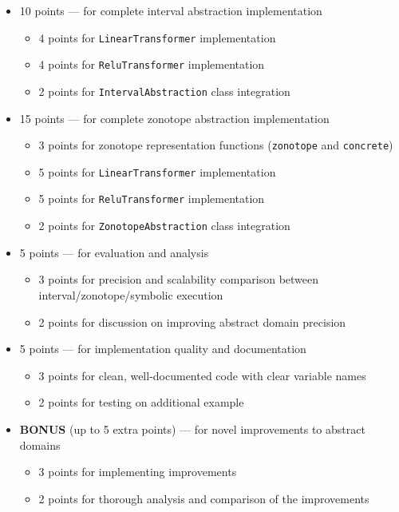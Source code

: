 \begin{itemize}
\item 10 points — for complete interval abstraction implementation
    \begin{itemize}
    \item 4 points for \texttt{LinearTransformer} implementation
    \item 4 points for \texttt{ReluTransformer} implementation
    \item 2 points for \texttt{IntervalAbstraction} class integration
    \end{itemize}
\item 15 points — for complete zonotope abstraction implementation
    \begin{itemize}
    \item 3 points for zonotope representation functions (\texttt{zonotope} and \texttt{concrete})
    \item 5 points for \texttt{LinearTransformer} implementation
    \item 5 points for \texttt{ReluTransformer} implementation
    \item 2 points for \texttt{ZonotopeAbstraction} class integration
    \end{itemize}
\item 5 points — for evaluation and analysis
    \begin{itemize}
    \item 3 points for precision and scalability comparison between interval/zonotope/symbolic execution
    \item 2 points for discussion on improving abstract domain precision
    \end{itemize}
\item 5 points — for implementation quality and documentation
    \begin{itemize}
    \item 3 points for clean, well-documented code with clear variable names
    \item 2 points for testing on additional example
    \end{itemize}
\item \textbf{BONUS} (up to 5 extra points) — for novel improvements to abstract domains
    \begin{itemize}
    \item 3 points for implementing improvements
    \item 2 points for thorough analysis and comparison of the improvements
    \end{itemize}
\end{itemize}
